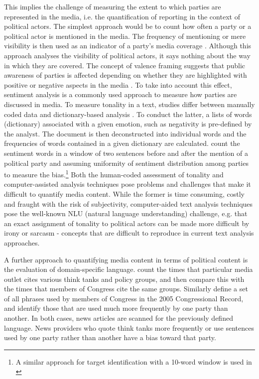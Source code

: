 \documentclass[12pt,a4paper,notitlepage]{article}
\begin{document}
This implies the challenge of measuring the extent to which parties are represented in the media, i.e. the quantification of reporting in the context of political actors. The simplest approach would be to count how often a party or a political actor is mentioned in the media. The frequency of mentioning or mere visibility is then used as an indicator of a party's media coverage \citep{oegema_personalization_2009, eberl_one_2017, junque_de_fortuny_evaluating_2014}. Although this approach analyses the visibility of political actors, it says nothing about the way in which they are covered. The concept of valence framing suggests that public awareness of parties is affected depending on whether they are highlighted with positive or negative aspects in the media \citep{de_vreese_valenced_2006, hurtikova_importance_2017}. To take into account this effect, sentiment analysis is a commonly used approach to measure how parties are discussed in media. To measure tonality in a text, studies differ between manually coded data \citep{eberl_one_2017, dewenter_can_2018} and dictionary-based analysis \citep{junque_de_fortuny_media_2012}. To conduct the latter, a lists of words (dictionary) associated with a given emotion, such as negativity is pre-defined by the analyst. The document is then deconstructed into individual words and the frequencies of words contained in a given dictionary are calculated. \citet{junque_de_fortuny_media_2012} count the sentiment words in a window of two sentences before and after the mention of a political party and assuming uniformity of sentiment distribution among parties to measure the bias.\footnote{A similar approach for target identification with a 10-word window is used in \citet{balahur_sentiment_2013}} Both the human-coded assessment of tonality and computer-assisted analysis techniques pose problems and challenges that make it difficult to quantify media content. While the former is time consuming, costly and fraught with the risk of subjectivity, computer-aided text analysis techniques pose the well-known NLU (natural language understanding) challenge, e.g. that an exact assignment of tonality to political actors can be made more difficult by irony or sarcasm - concepts that are difficult to reproduce in current text analysis approaches.

A further approach to quantifying media content in terms of political content is the evaluation of domain-specific language. \citet{groseclose_measure_2005} count the times that particular media outlet cites various think tanks and policy groups, and then compare this with the times that members of Congress cite the same groups. Similarly \citet{gentzkow_what_2010} define a set of all phrases used by members of Congress in the 2005 Congressional Record, and identify those that are used much more frequently by one party than another. In both cases, news articles are scanned for the previously defined language. News providers who quote think tanks more frequently or use sentences used by one party rather than another have a bias toward that party. 
\end{document}
